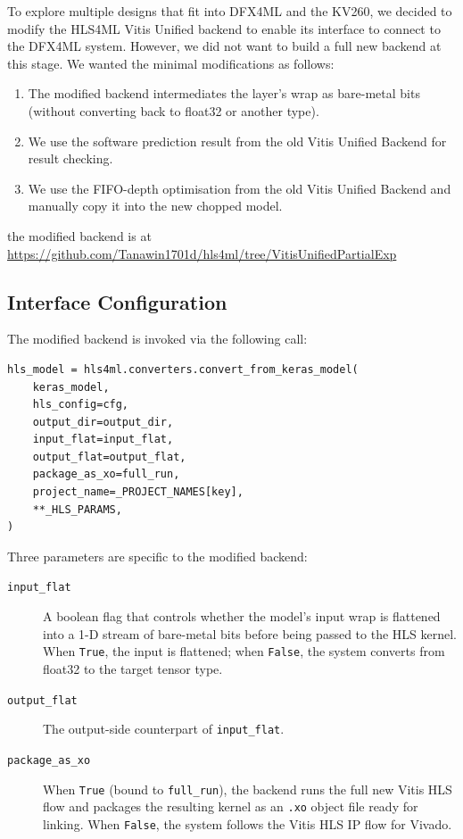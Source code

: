 \documentclass{cernatsnote}
\begin{document}
To explore multiple designs that fit into DFX4ML and the KV260, we decided to modify the HLS4ML Vitis Unified backend to enable its interface to connect to the DFX4ML system. However, we did not want to build a full new backend at this stage. We wanted the minimal modifications as follows:

\begin{enumerate}
  \item The modified backend intermediates the layer's wrap as bare-metal bits (without converting back to float32 or another type).
  \item We use the software prediction result from the old Vitis Unified Backend for result checking.
  \item We use the FIFO-depth optimisation from the old Vitis Unified Backend and manually copy it into the new chopped model.
\end{enumerate}

\begin{sloppypar}
the modified backend is at \url{https://github.com/Tanawin1701d/hls4ml/tree/VitisUnifiedPartialExp}
\end{sloppypar}


\subsection{Interface Configuration}

The modified backend is invoked via the following call:

\begin{lstlisting}[style=python]
hls_model = hls4ml.converters.convert_from_keras_model(
    keras_model,
    hls_config=cfg,
    output_dir=output_dir,
    input_flat=input_flat,
    output_flat=output_flat,
    package_as_xo=full_run,
    project_name=_PROJECT_NAMES[key],
    **_HLS_PARAMS,
)
\end{lstlisting}
 
Three parameters are specific to the modified backend:

\begin{description}
  \item[\texttt{input\_flat}]
    A boolean flag that controls whether the model's input wrap is flattened into a 1-D stream of bare-metal bits before being passed to the HLS kernel.
    When \texttt{True}, the input is flattened; when \texttt{False}, the system converts from float32 to the target tensor type.

  \item[\texttt{output\_flat}]
    The output-side counterpart of \texttt{input\_flat}.

  \item[\texttt{package\_as\_xo}]
    When \texttt{True} (bound to \texttt{full\_run}), the backend runs the full new Vitis HLS flow and packages the resulting kernel as an \texttt{.xo} object file ready for linking.
    When \texttt{False}, the system follows the Vitis HLS IP flow for Vivado.
\end{description}
\end{document}
